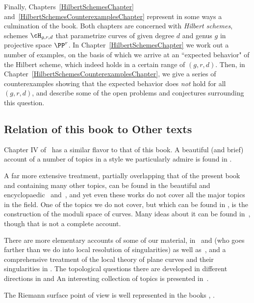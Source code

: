  Finally, Chapters~\ref{HilbertSchemesChapter} and~\ref{HilbertSchemesCounterexamplesChapter} represent in some ways a culmination of the book. Both chapters are concerned with \emph{Hilbert schemes}, schemes $\cH_{g,r,d}$ that parametrize curves of given degree $d$ and genus $g$ in projective space $\PP^r$. In Chapter~\ref{HilbertSchemesChapter} we work out a number of examples, on the basis of which we arrive at an ``expected behavior" of the Hilbert scheme, which indeed holds in a certain range of $(g,r,d)$. Then, in Chapter~\ref{HilbertSchemesCounterexamplesChapter}, we give a series of counterexamples showing that the expected behavior does \emph{not} hold for all $(g,r,d)$, and describe some of the open problems and conjectures surrounding this question.



\subsection{Relation of this book to Other texts} 
Chapter IV of~\cite{Hartshorne1977} has a similar flavor to that of this book. A beautiful (and brief) account of a number of topics in a style we particularly admire is found in \cite{MumfordCJ}.

A far more extensive treatment, partially overlapping that of the present book and containing many other topics, can be found in the beautiful and encyclopaedic~\cite{ACGH} and~\cite{ACG}, and yet even these works do not cover all the major topics in the field. 
One of the topics we do not cover, but which can be found in \cite{ACG}, is the construction of the moduli space of curves. Many  ideas  about it can be found in~\cite{HarrisMorrison1998}, though  that is not a complete account. 

There are more elementary accounts of some of our material, in~\cite{Fulton1989} and \cite{Walker1978} (who goes farther than we do into local resolution of singularities) as well as~\cite{Griffiths-curves}, and a comprehensive treatment of the local theory of plane curves and their singularities in \cite{Brieskorn1986}. The topological questions there are developed in different directions in \cite{MR0239612} %
 and \cite{MR817982}%
 An interesting collection of topics is presented in~\cite{Clemens-Scrapbook}.

 The Riemann surface point of view is well represented in the books \cite{Forster} \cite{Gunning}, \cite{Gunning-2} \cite{Kirwan}\cite{Miranda}. 


